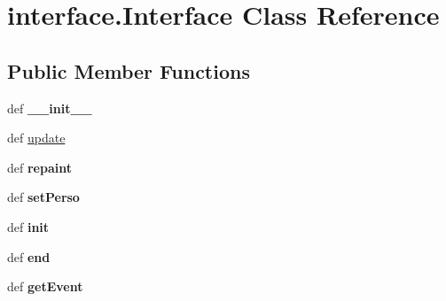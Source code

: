 \hypertarget{classinterface_1_1_interface}{\section{interface.\-Interface \-Class \-Reference}
\label{classinterface_1_1_interface}
}
\subsection*{\-Public \-Member \-Functions}
\begin{DoxyCompactItemize}
\item 
\hypertarget{classinterface_1_1_interface_a6c0b17621a9df83cf7ca8d91da4d7d91}{def {\bfseries \-\_\-\-\_\-init\-\_\-\-\_\-}}\label{classinterface_1_1_interface_a6c0b17621a9df83cf7ca8d91da4d7d91}

\item 
def \hyperlink{classinterface_1_1_interface_aef9ff34e533ed2aae3f56ddc22030e86}{update}
\item 
\hypertarget{classinterface_1_1_interface_a980b8ccbab2496d0239c171bddfbd7bf}{def {\bfseries repaint}}\label{classinterface_1_1_interface_a980b8ccbab2496d0239c171bddfbd7bf}

\item 
\hypertarget{classinterface_1_1_interface_abd853bef05ae074b27eb727bdf4edaf5}{def {\bfseries set\-Perso}}\label{classinterface_1_1_interface_abd853bef05ae074b27eb727bdf4edaf5}

\item 
\hypertarget{classinterface_1_1_interface_a2b257c2660cd3089fd11bbf6fa78979d}{def {\bfseries init}}\label{classinterface_1_1_interface_a2b257c2660cd3089fd11bbf6fa78979d}

\item 
\hypertarget{classinterface_1_1_interface_a5150979fd183cedf31bbc54bba33a4ce}{def {\bfseries end}}\label{classinterface_1_1_interface_a5150979fd183cedf31bbc54bba33a4ce}

\item 
\hypertarget{classinterface_1_1_interface_a313d941c9d7ed8e83cf92a539d4f1ed5}{def {\bfseries get\-Event}}\label{classinterface_1_1_interface_a313d941c9d7ed8e83cf92a539d4f1ed5}

\end{DoxyCompactItemize}
